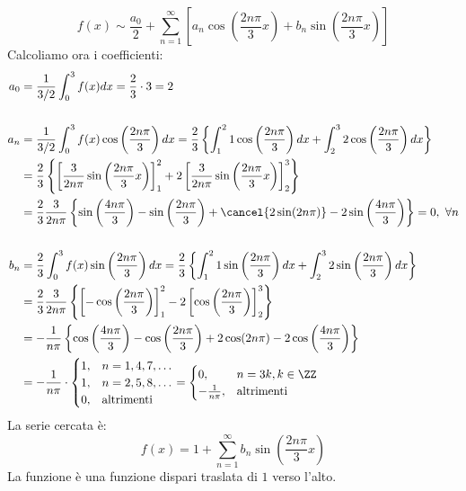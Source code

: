 \FloatBarrier

\begin{equation*}
f(x) \sim \frac{a_{0}}{2} + \sum\limits^{\infty}_{n = 1}\left[ a_{n}\cos\left(\frac{2n\pi}{3} x\right) + b_{n}\sin\left(\frac{2n\pi}{3} x\right)\right]
\end{equation*}
Calcoliamo ora i coefficienti:
\begin{align*}
a_{0} & = \frac{1}{3/2}\int^{3}_{0} f(x)dx = \frac{2}{3} \cdot 3 = 2\\
 & \\
a_{n} & = \frac{1}{3/2}\int^{3}_{0} f(x)\cos\left(\frac{2n\pi}{3}\right) dx = \frac{2}{3}\left\{\int^{2}_{1} 1\cos\left(\frac{2n\pi}{3}\right) dx + \int^{3}_{2} 2\cos\left(\frac{2n\pi}{3}\right) dx\right\}\\
 & = \frac{2}{3}\left\{\left[\frac{3}{2n\pi}\sin\left(\frac{2n\pi}{3} x\right)\right]^{2}_{1} + 2\left[\frac{3}{2n\pi}\sin\left(\frac{2n\pi}{3} x\right)\right]^{3}_{2}\right\}\\
 & = \frac{2}{3}\frac{3}{2n\pi}\left\{\sin\left(\frac{4n\pi}{3}\right) - \sin\left(\frac{2n\pi}{3}\right) + \cancel{2\sin(2n\pi)} - 2\sin\left(\frac{4n\pi}{3}\right)\right\} = 0, \ \forall n\\
 & \\
b_{n} & = \frac{2}{3}\int^{3}_{0} f(x)\sin\left(\frac{2n\pi}{3}\right) dx = \frac{2}{3}\left\{\int^{2}_{1} 1\sin\left(\frac{2n\pi}{3}\right) dx + \int^{3}_{2} 2\sin\left(\frac{2n\pi}{3}\right) dx\right\}\\
 & = \frac{2}{3}\frac{3}{2n\pi}\left\{\left[ - \cos\left(\frac{2n\pi}{3}\right)\right]^{2}_{1} - 2\left[\cos\left(\frac{2n\pi}{3}\right)\right]^{3}_{2}\right\}\\
 & = - \frac{1}{n\pi}\left\{\cos\left(\frac{4n\pi}{3}\right) - \cos\left(\frac{2n\pi}{3}\right) + 2\cos(2n\pi) - 2\cos\left(\frac{4n\pi}{3}\right)\right\}\\
 & = - \frac{1}{n\pi} \cdot
\begin{cases}
1, & n = 1, 4, 7, \dotsc \\
1, & n = 2, 5, 8, \dotsc \\
0, & \text{altrimenti}
\end{cases} =
\begin{cases}
0, & n = 3k, k\in \ZZ \\
- \frac{1}{n\pi}, & \text{altrimenti}
\end{cases}
\end{align*}
La serie cercata è:
\begin{equation*}
f(x) = 1 + \sum^{\infty}_{n = 1} b_{n}\sin\left(\frac{2n\pi}{3} x\right)
\end{equation*}
La funzione è una funzione dispari traslata di $1$ verso l'alto.

